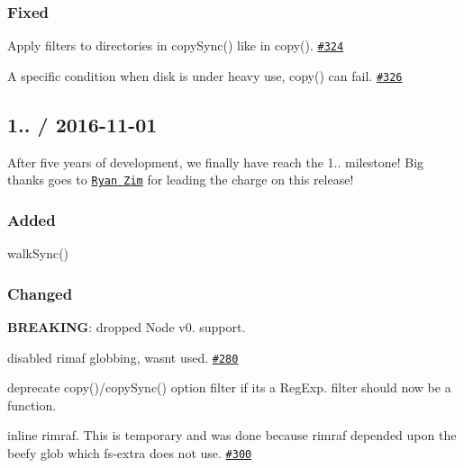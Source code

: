 \subsubsection*{Fixed}


\begin{DoxyItemize}
\item Apply filters to directories in {\ttfamily copy\+Sync()} like in {\ttfamily copy()}. \href{https://github.com/jprichardson/node-fs-extra/pull/324}{\tt \#324}
\item A specific condition when disk is under heavy use, {\ttfamily copy()} can fail. \href{https://github.com/jprichardson/node-fs-extra/issues/326}{\tt \#326}
\end{DoxyItemize}

\subsection*{1.. / 2016-\/11-\/01 }

After five years of development, we finally have reach the 1.. milestone! Big thanks goes to \href{https://github.com/RyanZim}{\tt Ryan Zim} for leading the charge on this release!

\subsubsection*{Added}


\begin{DoxyItemize}
\item {\ttfamily walk\+Sync()}
\end{DoxyItemize}

\subsubsection*{Changed}


\begin{DoxyItemize}
\item {\bfseries B\+R\+E\+A\+K\+I\+NG}\+: dropped Node v0. support.
\item disabled {\ttfamily rimaf} globbing, wasn\textquotesingle{}t used. \href{https://github.com/jprichardson/node-fs-extra/pull/280}{\tt \#280}
\item deprecate {\ttfamily copy()/copy\+Sync()} option {\ttfamily filter} if it\textquotesingle{}s a {\ttfamily Reg\+Exp}. {\ttfamily filter} should now be a function.
\item inline {\ttfamily rimraf}. This is temporary and was done because {\ttfamily rimraf} depended upon the beefy {\ttfamily glob} which {\ttfamily fs-\/extra} does not use. \href{https://github.com/jprichardson/node-fs-extra/pull/300}{\tt \#300}
\end{DoxyItemize}

